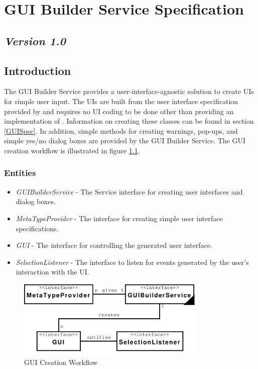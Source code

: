 %

\chapter{GUI Builder Service Specification}
\section*{\textit{Version 1.0}}
\section{Introduction}

The GUI Builder Service provides a user-interface-agnostic solution to create UIs
for simple user input. The UIs are built from the user interface specification
provided by  and requires no UI coding to be done other
than providing an implementation of . Information on
creating these classes can be found in section \ref{GUISpec}. In addition, simple
methods for creating warnings, pop-ups, and simple yes/no dialog boxes are
provided by the GUI Builder Service. The GUI creation workflow is illustrated in
figure \ref{fig:guiCreationWorkflow}.

\subsection{Entities}

\begin{itemize}
  \item \textit{GUIBuilderService} - The Service interface for creating
  user interfaces and dialog boxes.
  \item \textit{MetaTypeProvider} - The interface for creating simple user
  interface specifications.
  \item \textit{GUI} - The interface for controlling the
   generated user interface.
  \item \textit{SelectionListener} - The interface to listen for events
  generated by the user's interaction with the UI.
\end{itemize}

\begin{figure}[htb!]
\centering
\includegraphics[width=90mm]{../img/guiCreationWorkflow.pdf}
\caption{GUI Creation Workflow}
\label{fig:guiCreationWorkflow}
\end{figure}

\orgcishellserviceguibuilder{}

